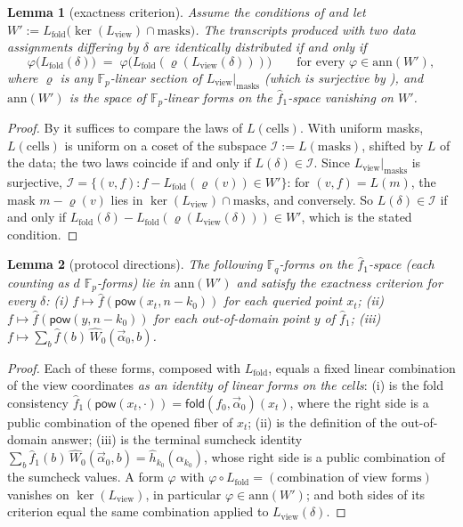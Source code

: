 \documentclass{article}
\newcommand{\Fp}{\mathbb{F}_p}
\newcommand{\Fq}{\mathbb{F}_q}
\newcommand{\extdeg}{d}
\newcommand{\pow}{\mathsf{pow}}
\newcommand{\fold}{\mathsf{fold}}
\newtheorem{lemma}{Lemma}
\theoremstyle{definition}
\begin{document}
\begin{lemma}[exactness criterion]\label{lem:criterion}
Assume the conditions of  and let $W' := L_{\mathrm{fold}}\big(\ker(L_{\mathrm{view}}) \cap \mathrm{masks}\big)$. The transcripts produced with two data assignments differing by $\delta$ are identically distributed if and only if
\[
\varphi\big(L_{\mathrm{fold}}(\delta)\big) \;=\; \varphi\big(L_{\mathrm{fold}}(\varrho(L_{\mathrm{view}}(\delta)))\big) \qquad \text{for every } \varphi \in \mathrm{ann}(W') ,
\]
where $\varrho$ is any $\Fp$-linear section of $L_{\mathrm{view}}|_{\mathrm{masks}}$ (which is surjective by ), and $\mathrm{ann}(W')$ is the space of $\Fp$-linear forms on the $\hat{f}_1$-space vanishing on $W'$.
\end{lemma}

\begin{proof}
By  it suffices to compare the laws of $L(\mathrm{cells})$. With uniform masks, $L(\mathrm{cells})$ is uniform on a coset of the subspace $\mathcal{I} := L(\mathrm{masks})$, shifted by $L$ of the data; the two laws coincide if and only if $L(\delta) \in \mathcal{I}$. Since $L_{\mathrm{view}}|_{\mathrm{masks}}$ is surjective, $\mathcal{I} = \{(v, f) : f - L_{\mathrm{fold}}(\varrho(v)) \in W'\}$: for $(v,f) = L(m)$, the mask $m - \varrho(v)$ lies in $\ker(L_{\mathrm{view}}) \cap \mathrm{masks}$, and conversely. So $L(\delta) \in \mathcal{I}$ if and only if $L_{\mathrm{fold}}(\delta) - L_{\mathrm{fold}}(\varrho(L_{\mathrm{view}}(\delta))) \in W'$, which is the stated condition.
\end{proof}

\begin{lemma}[protocol directions]\label{lem:protocoldirs}
The following $\Fq$-forms on the $\hat{f}_1$-space (each counting as $\extdeg$ $\Fp$-forms) lie in $\mathrm{ann}(W')$ and satisfy the exactness criterion for \emph{every} $\delta$: (i) $f \mapsto \hat{f}(\pow(x_t, n - k_0))$ for each queried point $x_t$; (ii) $f \mapsto \hat{f}(\pow(y, n - k_0))$ for each out-of-domain point $y$ of $\hat{f}_1$; (iii) $f \mapsto \sum_b \hat{f}(b)\, \hat{W}_0(\vec{\alpha}_0, b)$.
\end{lemma}

\begin{proof}
Each of these forms, composed with $L_{\mathrm{fold}}$, equals a fixed linear combination of the view coordinates \emph{as an identity of linear forms on the cells}: (i) is the fold consistency $\hat{f}_1(\pow(x_t, \cdot)) = \fold(f_0, \vec{\alpha}_0)(x_t)$, where the right side is a public combination of the opened fiber of $x_t$; (ii) is the definition of the out-of-domain answer; (iii) is the terminal sumcheck identity $\sum_b \hat{f}_1(b)\, \hat{W}_0(\vec{\alpha}_0, b) = \hat{h}_{k_0}(\alpha_{k_0})$, whose right side is a public combination of the sumcheck values. A form $\varphi$ with $\varphi \circ L_{\mathrm{fold}} = (\text{combination of view forms})$ vanishes on $\ker(L_{\mathrm{view}})$, in particular $\varphi \in \mathrm{ann}(W')$; and both sides of its criterion equal the same combination applied to $L_{\mathrm{view}}(\delta)$.
\end{proof}
\end{document}
